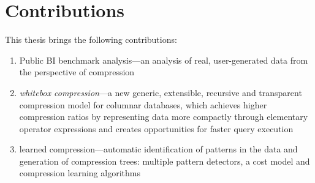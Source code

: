 
\newpage
\section{Contributions}

This thesis brings the following contributions:
\begin{enumerate}[1)]
\item Public BI benchmark analysis---an analysis of real, user-generated data from the perspective of compression
\item \textit{whitebox compression}---a new generic, extensible, recursive and transparent compression model for columnar databases, which achieves higher compression ratios by representing data more compactly through elementary operator expressions and creates opportunities for faster query execution
\item learned compression---automatic identification of patterns in the data and generation of compression trees: multiple pattern detectors, a cost model and compression learning algorithms
\end{enumerate}






